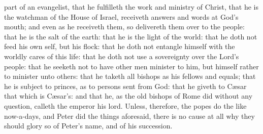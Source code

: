 part of an evangelist, that he fulfilleth the work and ministry of Christ,
that he is the watchman of the House of Israel, receiveth answers and
words at God’s mouth; and even as he receiveth them, so delivereth
them over to the people: that he is the salt of the earth: that he is
the light of the world: that he doth not feed his own self, but his
flock: that he doth not entangle himself with the worldly cares of this
life: that he doth not use a sovereignty over the Lord’s people:
that he seeketh not to have other men minister to him, but himself rather
to minister unto others: that he taketh all bishops as his fellows and
equals; that he is subject to princes, as to persons sent from God:
that he giveth to Cæsar that which is Cæsar’s: and
that he, as the old bishops of Rome did without any question, calleth
the emperor his lord. Unless, therefore, the popes do the like
now-a-days, and Peter did the things aforesaid, there
is no cause at all why they should glory so of Peter’s name, and
of his succession.

